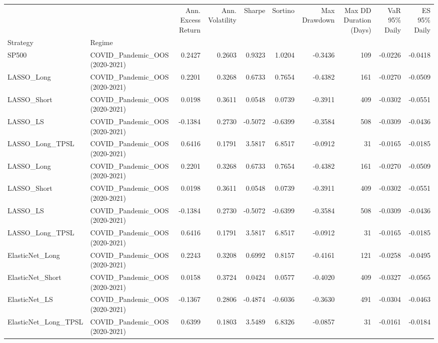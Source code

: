 \begin{tabular}{llrrrrrrrr}
\toprule
 &  & Ann. Excess Return & Ann. Volatility & Sharpe & Sortino & Max Drawdown & Max DD Duration (Days) & VaR 95\% Daily & ES 95\% Daily \\
Strategy & Regime &  &  &  &  &  &  &  &  \\
\midrule
SP500 & COVID\_Pandemic\_OOS (2020-2021) & 0.2427 & 0.2603 & 0.9323 & 1.0204 & -0.3436 & 109 & -0.0226 & -0.0418 \\
\cline{1-10}
LASSO\_Long & COVID\_Pandemic\_OOS (2020-2021) & 0.2201 & 0.3268 & 0.6733 & 0.7654 & -0.4382 & 161 & -0.0270 & -0.0509 \\
\cline{1-10}
LASSO\_Short & COVID\_Pandemic\_OOS (2020-2021) & 0.0198 & 0.3611 & 0.0548 & 0.0739 & -0.3911 & 409 & -0.0302 & -0.0551 \\
\cline{1-10}
LASSO\_LS & COVID\_Pandemic\_OOS (2020-2021) & -0.1384 & 0.2730 & -0.5072 & -0.6399 & -0.3584 & 508 & -0.0309 & -0.0436 \\
\cline{1-10}
LASSO\_Long\_TPSL & COVID\_Pandemic\_OOS (2020-2021) & 0.6416 & 0.1791 & 3.5817 & 6.8517 & -0.0912 & 31 & -0.0165 & -0.0185 \\
\cline{1-10}
LASSO\_Long & COVID\_Pandemic\_OOS (2020-2021) & 0.2201 & 0.3268 & 0.6733 & 0.7654 & -0.4382 & 161 & -0.0270 & -0.0509 \\
\cline{1-10}
LASSO\_Short & COVID\_Pandemic\_OOS (2020-2021) & 0.0198 & 0.3611 & 0.0548 & 0.0739 & -0.3911 & 409 & -0.0302 & -0.0551 \\
\cline{1-10}
LASSO\_LS & COVID\_Pandemic\_OOS (2020-2021) & -0.1384 & 0.2730 & -0.5072 & -0.6399 & -0.3584 & 508 & -0.0309 & -0.0436 \\
\cline{1-10}
LASSO\_Long\_TPSL & COVID\_Pandemic\_OOS (2020-2021) & 0.6416 & 0.1791 & 3.5817 & 6.8517 & -0.0912 & 31 & -0.0165 & -0.0185 \\
\cline{1-10}
ElasticNet\_Long & COVID\_Pandemic\_OOS (2020-2021) & 0.2243 & 0.3208 & 0.6992 & 0.8157 & -0.4161 & 121 & -0.0258 & -0.0495 \\
\cline{1-10}
ElasticNet\_Short & COVID\_Pandemic\_OOS (2020-2021) & 0.0158 & 0.3724 & 0.0424 & 0.0577 & -0.4020 & 409 & -0.0327 & -0.0565 \\
\cline{1-10}
ElasticNet\_LS & COVID\_Pandemic\_OOS (2020-2021) & -0.1367 & 0.2806 & -0.4874 & -0.6036 & -0.3630 & 491 & -0.0304 & -0.0463 \\
\cline{1-10}
ElasticNet\_Long\_TPSL & COVID\_Pandemic\_OOS (2020-2021) & 0.6399 & 0.1803 & 3.5489 & 6.8326 & -0.0857 & 31 & -0.0161 & -0.0184 \\

\end{tabular}
